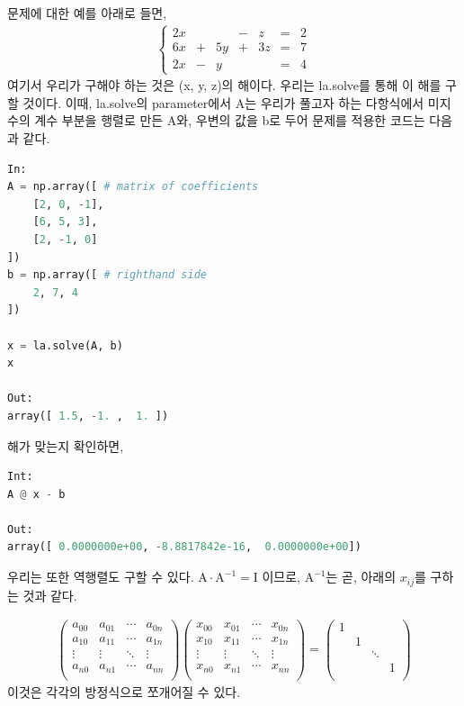 \documentclass[11pt]{article}
\begin{document}
문제에 대한 예를 아래로 들면, 
\begin{equation}
\begin{split}
\left\{
\begin{matrix}
2x & & & - & z &= &2
\\
6x & + & 5y & + & 3z &= &7
\\
2x & - & y & & &= &4
\end{matrix}
\right.
\end{split}
\end{equation}
여기서 우리가 구해야 하는 것은 (x, y, z)의 해이다. 우리는 la.solve를 통해 이 해를 구할 것이다. 이때, la.solve의 parameter에서 A는 우리가 풀고자 하는 다항식에서 미지수의 계수 부분을 행렬로 만든 A와, 우변의 값을 b로 두어 문제를 적용한 코드는 다음과 같다.

\begin{lstlisting}[language=Python]
In:
A = np.array([ # matrix of coefficients
    [2, 0, -1],
    [6, 5, 3],
    [2, -1, 0]
])
b = np.array([ # righthand side
    2, 7, 4
])

x = la.solve(A, b)
x

Out:
array([ 1.5, -1. ,  1. ])
\end{lstlisting}
해가 맞는지 확인하면, 

\begin{lstlisting}[language=Python]
Int:
A @ x - b

Out:
array([ 0.0000000e+00, -8.8817842e-16,  0.0000000e+00])
\end{lstlisting}
우리는 또한 역행렬도 구할 수 있다. $\mathrm A\cdot \mathrm A^{-1} = \mathrm I$ 이므로, $\mathrm A^{-1}$는 곧, 아래의 $x_{ij}$를 구하는 것과 같다. 

\begin{equation}
\begin{split}
\left(
\begin{matrix}
a_{00} & a_{01} & \cdots & a_{0n} \\
a_{10} & a_{11} & \cdots & a_{1n} \\
\vdots & \vdots & \ddots & \vdots \\
a_{n0} & a_{n1} & \cdots & a_{nn} \\
\end{matrix}
\right)
\left(
\begin{matrix}
x_{00} & x_{01} & \cdots & x_{0n} \\
x_{10} & x_{11} & \cdots & x_{1n} \\
\vdots & \vdots & \ddots & \vdots \\
x_{n0} & x_{n1} & \cdots & x_{nn} \\
\end{matrix}
\right)
=
\left(
\begin{matrix}
1 &   &        &   \\
  & 1 &        &   \\
  &   & \ddots &   \\
  &   &        & 1 \\
\end{matrix}
\right)
\end{split}
\end{equation}
이것은 각각의 방정식으로 쪼개어질 수 있다.
\end{document}
